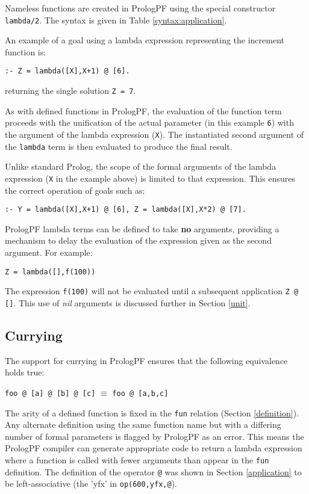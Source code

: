 Nameless functions are created in PrologPF using the special constructor
\texttt{lambda/2}.  The syntax is given in Table \ref{syntax:application}.

An example of a goal using a lambda expression representing the increment
function is:

\texttt{:- Z = lambda([X],X+1) @ [6].}

returning the single solution \texttt{Z = 7}.

As with defined functions in PrologPF,
the evaluation of the function term proceeds
with the unification of the actual parameter (in this example
\texttt{6}) with the argument of the lambda expression (\texttt{X}).
The instantiated second argument of the \texttt{lambda} term is then evaluated
to produce the final result.

Unlike standard Prolog, the scope of the formal arguments of the lambda
expression (\texttt{X} in the example above) is limited to that expression.
This ensures the correct operation of goals such as:\\
\centerline{\texttt{:- Y = lambda([X],X+1) @ [6], Z = lambda([X],X*2) @ [7].}}

PrologPF lambda terms can be defined to take \textbf{no} arguments, providing a
mechanism to delay the evaluation of the expression given as the second
argument.  For example:\\
\centerline{\texttt{Z = lambda([],f(100))}}
The expression \texttt{f(100)} will not be evaluated until a subsequent application
\texttt{Z @ []}.  This use of \textit{nil} arguments is discussed further in
Section \ref{unit}.

\subsection{Currying}

The support for currying in PrologPF ensures that the following equivalence holds
true:\\
\centerline{\texttt{foo @ [a] @ [b] @ [c]} $\equiv$ \texttt{foo @ [a,b,c]}}

The arity of a defined function is fixed in the \texttt{fun} relation
(Section \ref{definition}). Any alternate definition using the same function
name but with a differing number of formal parameters is flagged by PrologPF
as an error.
This means the PrologPF compiler can generate appropriate code to return a lambda
expression where a function is called with fewer arguments than appear in the
\texttt{fun} definition. The definition of the operator \texttt{@} was shown in
Section \ref{application} to be left-associative (the 'yfx' in \texttt{op(600,yfx,@}).

